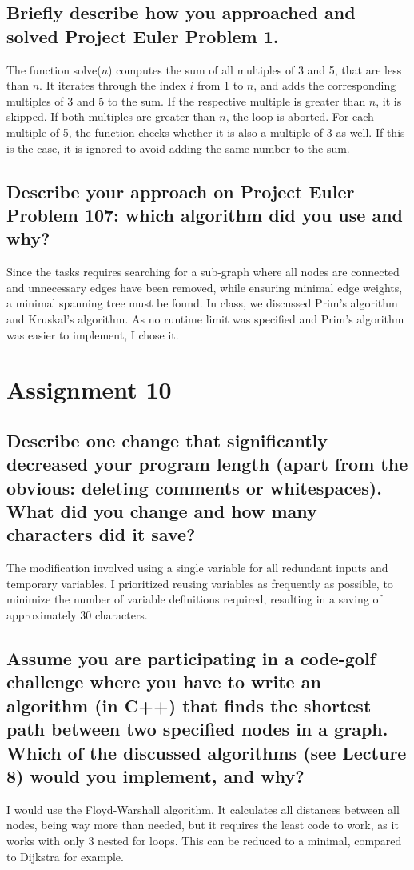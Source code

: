 \documentclass[runningheads]{llncs}
\begin{document}
\subsection*{Briefly describe how you approached and solved Project Euler Problem 1.}
The function solve($n$) computes the sum of all multiples of 3 and 5, that are less than $n$. It iterates through the index $i$ from 1 to $n$, and
adds the corresponding multiples of 3 and 5 to the sum. If the respective multiple is greater than $n$, it is skipped. If both multiples are greater than $n$, the
loop is aborted. For each multiple of 5, the function checks whether it is also a multiple of 3 as well. If this is the case, it is ignored to avoid adding the same number to the sum.

\subsection*{Describe your approach on Project Euler Problem 107: which algorithm did you use and why?}
Since the tasks requires searching for a sub-graph where all nodes are connected and unnecessary edges have been removed, while ensuring minimal edge weights,
a minimal spanning tree must be found. In class, we discussed Prim's algorithm and Kruskal's algorithm. As no runtime limit was specified and Prim's algorithm
was easier to implement, I chose it.

\section*{Assignment 10}

\subsection*{Describe one change that significantly decreased your program length (apart from the obvious: deleting comments or whitespaces). What did you change and how many characters did it save?}
The modification involved using a single variable for all redundant inputs and temporary variables. I prioritized reusing variables as frequently as possible, to minimize the number of variable definitions required,
resulting in a saving of approximately 30 characters.

\subsection*{Assume you are participating in a code-golf challenge where you have to write an algorithm (in C++) that finds the shortest path between two specified nodes in a graph. Which of the discussed algorithms (see Lecture 8) would you implement, and why?}
I would use the Floyd-Warshall algorithm. It calculates all distances between all nodes, being way more than needed, but it requires the least code to work, as it works with only 3
nested for loops. This can be reduced to a minimal, compared to Dijkstra for example.
\end{document}

